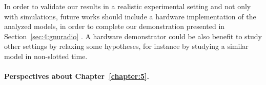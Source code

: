 




In order to validate our results in a realistic experimental setting and not only with simulations, future works should include a hardware implementation of the analyzed models, in order to complete our demonstration presented in Section~\ref{sec:4:gnuradio} \cite{Besson2018ICT,Besson2019WCNC}.
%
A hardware demonstrator could be also benefit to study other settings by relaxing some hypotheses, for instance by studying a similar model in non-slotted time.


\paragraph{Perspectives about \textbf{Chapter~\ref{chapter:5}}.}

